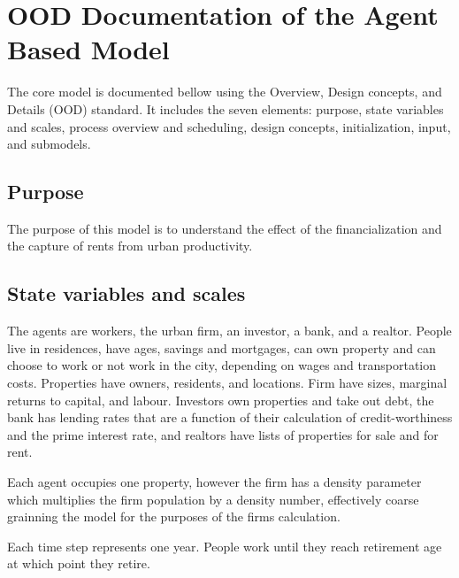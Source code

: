 
\chapter{OOD Documentation of the Agent Based Model} \label{appendix-odd}



The core model is documented bellow using the Overview, Design concepts, and Details (OOD) standard. It includes the seven elements: purpose, state variables and scales, process overview and scheduling, design concepts, initialization, input, and submodels.

\section{Purpose}

The purpose of this model is to understand the effect of the financialization and the capture of rents from urban productivity. %


\section{State variables and scales}

The agents are workers,  %
the urban firm, an investor, a bank, and a realtor. People live in residences, have ages, savings and mortgages, can own property and can choose to work or not work in the city, depending on wages and transportation costs. Properties have owners, residents, and locations. Firm have sizes, marginal returns to capital, and labour.  
Investors own properties and take out debt, the bank has lending rates that are a function of their calculation of credit-worthiness and the prime interest rate, and realtors have lists of properties for sale and for rent. 

Each agent occupies one property, however the firm has a density parameter which multiplies the firm population by a density number, effectively coarse grainning the model for the purposes of the firms calculation.

Each time step represents one year. People work until they reach retirement age at which point they retire. 

